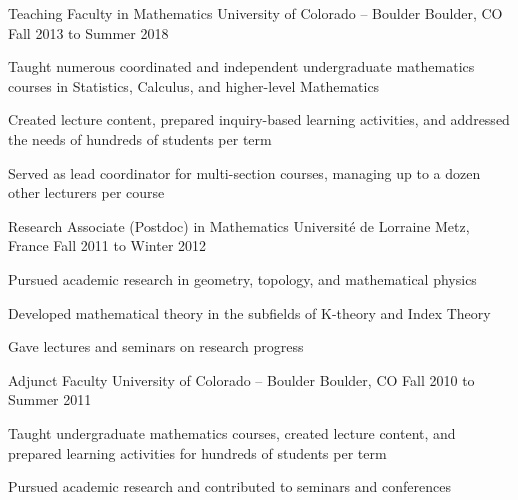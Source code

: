 \begin{cventries}
  \cventry
    {Teaching Faculty in Mathematics} %
    {University of Colorado -- Boulder} %
    {Boulder, CO} %
    {Fall 2013 to Summer 2018} %
    {
      \begin{cvitems} %
        \item {Taught numerous coordinated and independent undergraduate mathematics courses in Statistics, Calculus, and higher-level Mathematics}
        \item {Created lecture content, prepared inquiry-based learning activities, and addressed the needs of hundreds of students per term}
        \item {Served as lead coordinator for multi-section courses, managing up to a dozen other lecturers per course}
      \end{cvitems}
    }

  \cventry
    {Research Associate (Postdoc) in Mathematics} %
    {Universit\'e de Lorraine} %
    {Metz, France} %
    {Fall 2011 to Winter 2012} %
    {
      \begin{cvitems} %
      \item {Pursued academic research in geometry, topology, and mathematical physics}
      \item {Developed mathematical theory in the subfields of K-theory and Index Theory}
      \item {Gave lectures and seminars on research progress}
      \end{cvitems}
    }

  \cventry
    {Adjunct Faculty} %
    {University of Colorado -- Boulder} %
    {Boulder, CO} %
    {Fall 2010 to Summer 2011} %
    {
      \begin{cvitems} %
        \item {Taught undergraduate mathematics courses, created lecture content, and prepared learning activities for hundreds of students per term}
        \item {Pursued academic research and contributed to seminars and conferences}
      \end{cvitems}
    }

\end{cventries}
